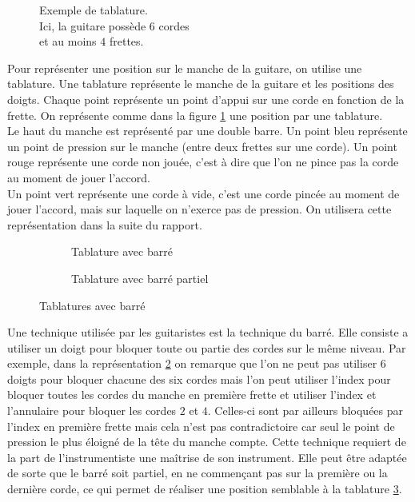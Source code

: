 \begin{figure}
  \centering {}
  \caption{
    Exemple de tablature.\\
    Ici, la guitare possède $6$ cordes\\
    et au moins $4$ frettes.
  }
  \label{tabla:Premiere}
\end{figure}
Pour représenter une position sur le manche de la guitare, on utilise une
tablature. 
Une tablature représente le manche de la guitare et les positions des doigts.
Chaque point représente un point d'appui sur une corde en fonction de la
frette.
On représente comme dans la figure \ref{tabla:Premiere} une position par une 
tablature.\\
Le haut du manche est représenté par une double barre.
Un point bleu représente un point de pression sur le manche (entre deux frettes
sur une corde).
Un point rouge représente une corde non jouée, c'est à dire que l'on ne pince
pas la corde au moment de jouer l'accord.\\
Un point vert représente une corde à vide, c'est une corde pincée au moment de
jouer l'accord, mais sur laquelle on n'exerce pas de pression.
On utilisera cette représentation dans la suite du rapport.


  \begin{figure}[H]
    \centering
    \begin{subfigure}{0.49\textwidth}
      \centering
      \caption{Tablature avec barré}
      \label{tabla:Barre}
    \end{subfigure}
    \hfill
    \begin{subfigure}{0.49\textwidth}
      \centering {}
      \caption{Tablature avec barré partiel}
      \label{tabla:BarrePartiel}
    \end{subfigure}
    \label{tabla:Double}
    \caption{Tablatures avec barré}
  \end{figure}

Une technique utilisée par les guitaristes est la technique du barré.
Elle consiste a utiliser un doigt pour bloquer toute ou partie des cordes sur
le même niveau.
Par exemple, dans la représentation \ref{tabla:Barre} on remarque que l'on
ne peut pas utiliser $6$ doigts pour bloquer chacune des six cordes mais l'on
peut utiliser l'index pour bloquer toutes les cordes du manche en première
frette et utiliser l'index et l'annulaire pour bloquer les cordes $2$ et $4$.
Celles-ci sont par ailleurs bloquées par l'index en première frette mais cela
n'est pas contradictoire car seul le point de pression le plus éloigné de la 
tête du manche compte.
Cette technique requiert de la part de l'instrumentiste une maîtrise de son
instrument. Elle peut être adaptée de sorte que le barré soit partiel, en ne
commençant pas sur la première ou la dernière corde, ce qui permet de
réaliser une position semblable à la tablature \ref{tabla:BarrePartiel}.


